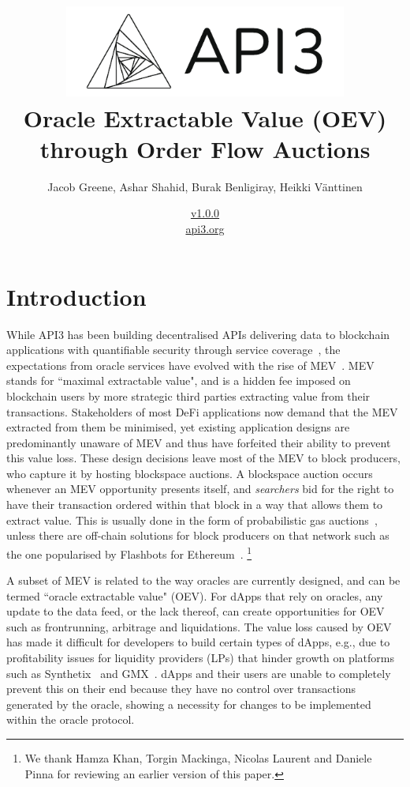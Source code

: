 \documentclass[11pt]{article}
\title{\includegraphics[width=0.7\textwidth]{fig/api3/api3} \\ Oracle Extractable Value (OEV)\\ through Order Flow Auctions
}
\author{Jacob Greene, Ashar Shahid, Burak Benligiray, Heikki Vänttinen}
\date{\hyperref[sec:versions]{v1.0.0} \\ \medskip \href{https://api3.org}{api3.org}}
\begin{document}

\maketitle

\section{Introduction}

While API3 has been building decentralised APIs delivering data to blockchain applications with quantifiable security through service coverage~\cite{api3}, the expectations from oracle services have evolved with the rise of MEV~\cite{flashbots-explore}.
MEV stands for ``maximal extractable value", and is a hidden fee imposed on blockchain users by more strategic third parties extracting value from their transactions.
Stakeholders of most DeFi applications now demand that the MEV extracted from them be minimised, yet existing application designs are predominantly unaware of MEV and thus have forfeited their ability to prevent this value loss.
These design decisions leave most of the MEV to block producers, who capture it by hosting blockspace auctions.
A blockspace auction occurs whenever an MEV opportunity presents itself, and \textit{searchers} bid for the right to have their transaction ordered within that block in a way that allows them to extract value.
This is usually done in the form of probabilistic gas auctions~\cite{Daian:2019}, unless there are off-chain solutions for block producers on that network such as the one popularised by Flashbots for Ethereum~\cite{flashbots-boost}.
{\let\thefootnote\relax\footnote{{We thank Hamza Khan, Torgin Mackinga, Nicolas Laurent and Daniele Pinna for reviewing an earlier version of this paper.}}}

A subset of MEV is related to the way oracles are currently designed, and can be termed ``oracle extractable value" (OEV).
For dApps that rely on oracles, any update to the data feed, or the lack thereof, can create opportunities for OEV such as frontrunning, arbitrage and liquidations.
The value loss caused by OEV has made it difficult for developers to build certain types of dApps, e.g., due to profitability issues for liquidity providers (LPs) that hinder growth on platforms such as Synthetix~\cite{sip-37} and GMX~\cite{kip-17}.
dApps and their users are unable to completely prevent this on their end because they have no control over transactions generated by the oracle, showing a necessity for changes to be implemented within the oracle protocol.
\end{document}
